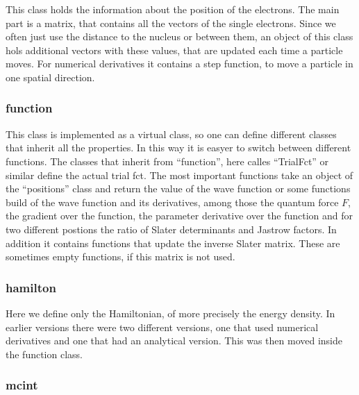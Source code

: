 \documentclass[a4paper,10pt]{article}
\begin{document}
This class holds the information about the position of the electrons. 
The main part is a matrix, that contains all the vectors of the single electrons. 
Since we often just use the distance to the nucleus or between them, an object of 
this class hols additional vectors with these values, that are updated each time a particle moves. 
For numerical derivatives it contains a step function, to move a particle in one spatial direction. 

\subsubsection{function}

This class is implemented as a virtual class, so one can define different classes that inherit all the properties. 
In this way it is easyer to switch between different functions. The classes that inherit from ``function'', here calles 
``TrialFct'' or similar define the actual trial fct.
The most important functions take an object of the ``positions'' class and return the value of the wave function or 
some functions build of the wave function and its derivatives, among those the quantum force $F$, the gradient over the function,
the parameter derivative over the function
and for two different postions the ratio of Slater determinants and Jastrow factors.
In addition it contains functions that update the inverse Slater matrix. These are sometimes empty functions, if this matrix is not used. 



\subsubsection{hamilton}

Here we define only the Hamiltonian, of more precisely the energy density.
In earlier versions there were two different versions, one that used numerical derivatives and one that had an analytical version.
This was then moved inside the function class.


\subsubsection{mcint}
\end{document}
